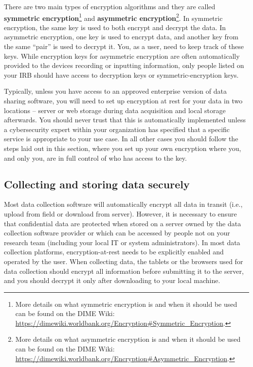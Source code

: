\documentclass[
]{book}
\begin{document}
There are two main types of encryption algorithms and they are called
\textbf{symmetric encryption}\footnote{More details on what symmetric encryption is and
  when it should be used can be found on the DIME Wiki:
  \url{https://dimewiki.worldbank.org/Encryption\#Symmetric_Encryption}.}
and \textbf{asymmetric encryption}\footnote{More details on what asymmetric encryption is and
  when it should be used can be found on the DIME Wiki:
  \url{https://dimewiki.worldbank.org/Encryption\#Asymmetric_Encryption}.}.
In symmetric encryption,
the same key is used to both encrypt and decrypt the data.
In asymmetric encryption, one key is used to encrypt data,
and another key from the same ``pair'' is used to decrypt it.
You, as a user, need to keep track of these keys.
While encryption keys for asymmetric encryption are often
automatically provided to the devices recording or inputting information,
only people listed on your IRB should have access to decryption keys
or symmetric-encryption keys.

Typically, unless you have access to an approved
enterprise version of data sharing software,
you will need to set up encryption at rest for your data
in two locations --
server or web storage during data acquisition and local storage afterwards.
You should never trust that this is automatically implemented
unless a cybersecurity expert within your organization
has specified that a specific service is appropriate to your use case.
In all other cases you should follow the steps laid out in this section,
where you set up your own encryption
where you, and only you, are in full control of who has access to the key.

\hypertarget{collecting-and-storing-data-securely}{%
\subsection*{Collecting and storing data securely}\label{collecting-and-storing-data-securely}}

Most data collection software will automatically encrypt
all data in transit (i.e., upload from field or download from server).
However, it is necessary to ensure that confidential data
are protected when stored on a server
owned by the data collection software provider
or which can be accessed by people not on your research team
(including your local IT or system administrators).
In most data collection platforms,
encryption-at-rest needs to be explicitly enabled and operated by the user.
When collecting data, the tablets or the browsers used for data collection
should encrypt all information before submitting it to the server,
and you should decrypt it only after downloading to your local machine.
\end{document}
